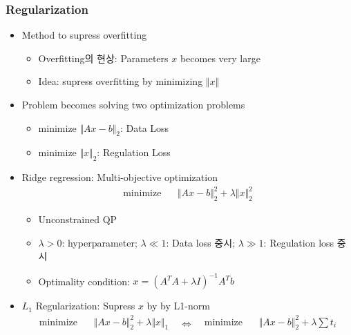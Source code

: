 \subsubsection*{Regularization}
\begin{itemize}
    \item Method to supress overfitting
    \begin{itemize}
        \item Overfitting의 현상: Parameters $x$ becomes very large
        \item Idea: supress overfitting by minimizing $\Vert x\Vert$
    \end{itemize}
    \item Problem becomes solving two optimization problems
    \begin{itemize}
        \item minimize $\Vert Ax-b\Vert_2$: Data Loss
        \item minimize $\Vert x\Vert_2$: Regulation Loss
    \end{itemize}
    \item Ridge regression: Multi-objective optimization
        $$ \begin{aligned}
            \mathrm{minimize}~~&~~\Vert Ax-b\Vert_2^2+\lambda\Vert x\Vert_2^2
        \end{aligned} $$
    \begin{itemize}
        \item Unconstrained QP
        \item $\lambda>0$: hyperparameter; $\lambda\ll1$: Data loss 중시; $\lambda\gg1$: Regulation loss 중시
        \item Optimality condition: $x=\left(A^TA+\lambda I\right)^{-1}A^Tb$
    \end{itemize}
    \begin{figures}
    \end{figures}
    \newpage
    \item $L_1$ Regularization: Supress $x$ by by L1-norm
        $$ \begin{aligned}
            \mathrm{minimize}~~&~~\Vert Ax-b\Vert_2^2+\lambda\Vert x\Vert_1 \\ {}
        \end{aligned}~~~\Leftrightarrow~~~\begin{aligned}
            \mathrm{minimize}~~&~~\Vert Ax-b\Vert_2^2+\lambda\sum t_i \\

\end{aligned}$$
\end{itemize}
